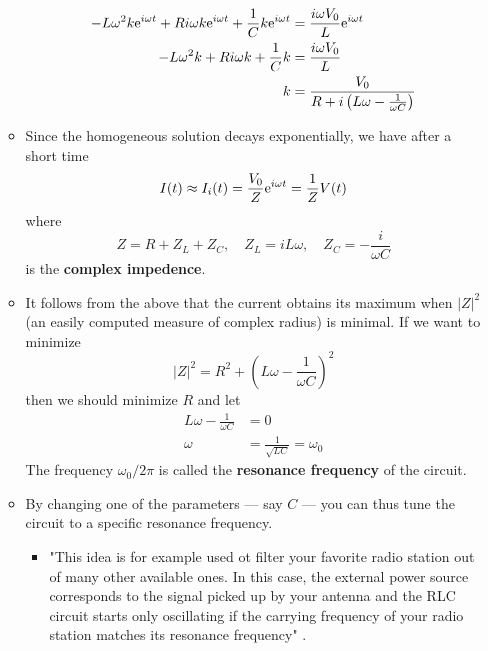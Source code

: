 \documentclass[../notes.tex]{subfiles}
\begin{document}
\begin{itemize}
\begin{itemize}
\begin{align*}
            -L\omega^2k\e[i\omega t]+Ri\omega k\e[i\omega t]+\frac{1}{C}k\e[i\omega t] &= \frac{i\omega V_0}{L}\e[i\omega t]\\
            -L\omega^2k+Ri\omega k+\frac{1}{C}k &= \frac{i\omega V_0}{L}\\
            k &= \frac{V_0}{R+i\left( L\omega-\frac{1}{\omega C} \right)}
        \end{align*}
        \item Since the homogeneous solution decays exponentially, we have after a short time
        \begin{equation*}
            I(t) \approx I_i(t)
            = \frac{V_0}{Z}\e[i\omega t]
            = \frac{1}{Z}V(t)
        \end{equation*}
        where
        \begin{equation*}
            Z = R+Z_L+Z_C,\quad
            Z_L = iL\omega,\quad
            Z_C = -\frac{i}{\omega C}
        \end{equation*}
        is the \textbf{complex impedence}.
        \item It follows from the above that the current obtains its maximum when $|Z|^2$ (an easily computed measure of complex radius) is minimal. If we want to minimize
        \begin{equation*}
            |Z|^2 = R^2+\left( L\omega-\frac{1}{\omega C} \right)^2
        \end{equation*}
        then we should minimize $R$ and let
        \begin{align*}
            L\omega-\frac{1}{\omega C} &= 0\\
            \omega &= \frac{1}{\sqrt{LC}} = \omega_0
        \end{align*}
        The frequency $\omega_0/2\pi$ is called the \textbf{resonance frequency} of the circuit.
        \item By changing one of the parameters --- say $C$ --- you can thus tune the circuit to a specific resonance frequency.
        \begin{itemize}
            \item "This idea is for example used ot filter your favorite radio station out of many other available ones. In this case, the external power source corresponds to the signal picked up by your antenna and the RLC circuit starts only oscillating if the carrying frequency of your radio station matches its resonance frequency" \parencite[79]{bib:Teschl}.
        \end{itemize}
    \end{itemize}

\end{itemize}
\end{document}
